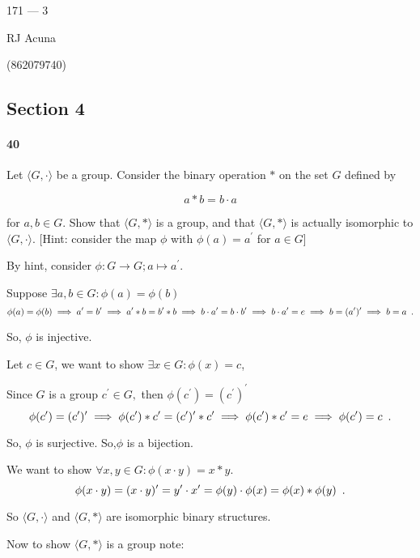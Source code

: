 \documentclass{article}
\begin{document}
\begin{center}
  171 --- 3

  RJ Acuna

  (862079740)
\end{center}\vspace{1.618em}

\subsection*{Section 4}

\paragraph{40} Let $\langle {G,\cdot} \rangle$ be a group. Consider
the binary operation $*$ on the set $G$ defined by

\[a*b = b\cdot a\]

for $a,b\in G$. Show that $\langle {G,*} \rangle$ is a group, and that
$\langle {G,*} \rangle$ is actually isomorphic to $\langle {G,\cdot}
\rangle$. [Hint: consider the map $\phi$ with $\phi(a) = a^\prime$ for
$a\in G$]


By hint, consider $\phi:G\rightarrow G; a\mapsto a^\prime$.

Suppose $\exists a,b\in G: \phi(a)=\phi(b)$
\[ \phi(a) =\phi(b) \implies
   a^\prime = b^\prime\implies
   a^\prime* b = b^\prime* b\implies
   b \cdot a^\prime = b\cdot b^\prime \implies
   b \cdot a^\prime = e \implies
   b = (a^{\prime})^{\prime} \implies
 b = a\enskip.\]

 So, $\phi$ is injective.

 Let $c \in G$, we want to show $\exists x\in G: \phi(x)= c$,

Since $G$ is a group $c^\prime \in G,$ then $\phi(c^\prime) =
(c^\prime)^\prime$
\[ \phi(c^\prime) =
(c^\prime)^\prime \implies
   \phi(c^\prime)*c^\prime =
   (c^\prime)^\prime*c^\prime \implies \phi(c^\prime)*c^\prime = e
   \implies \phi(c^\prime) = c\enskip.
 \]

 So, $\phi$ is surjective. So,$\phi$ is a bijection.

 We want to show $\forall x,y \in G: \phi(x\cdot y) = x*y$.
 \[ \phi(x\cdot y) = (x \cdot y)^\prime = y^\prime\cdot x^\prime =
   \phi(y)\cdot \phi(x) = \phi(x)*\phi(y)\enskip.
 \]

So $\langle {G,\cdot} \rangle$ and $\langle {G,*} \rangle$ are
isomorphic binary structures.

 Now to show $\langle {G,*} \rangle$ is a group note:
\end{document}
